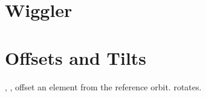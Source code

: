 \section{Wiggler} 
\label{s:wig}

\section{Offsets and Tilts}

, ,  offset an element from the reference orbit.
 rotates.

